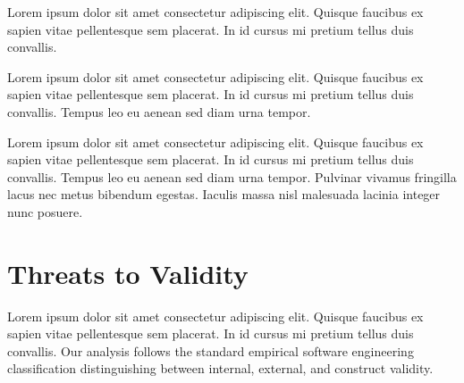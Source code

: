 \documentclass[sigconf,nonacm]{acmart} %
\begin{document}
Lorem ipsum dolor sit amet consectetur adipiscing elit. 
Quisque faucibus ex sapien vitae pellentesque sem placerat. 
In id cursus mi pretium tellus duis convallis. 

Lorem ipsum dolor sit amet consectetur adipiscing elit. 
Quisque faucibus ex sapien vitae pellentesque sem placerat. 
In id cursus mi pretium tellus duis convallis. 
Tempus leo eu aenean sed diam urna tempor. 

Lorem ipsum dolor sit amet consectetur adipiscing elit. 
Quisque faucibus ex sapien vitae pellentesque sem placerat. 
In id cursus mi pretium tellus duis convallis. 
Tempus leo eu aenean sed diam urna tempor. 
Pulvinar vivamus fringilla lacus nec metus bibendum egestas. 
Iaculis massa nisl malesuada lacinia integer nunc posuere. 

\section{Threats to Validity}
\label{sec:threats}

Lorem ipsum dolor sit amet consectetur adipiscing elit. 
Quisque faucibus ex sapien vitae pellentesque sem placerat. 
In id cursus mi pretium tellus duis convallis. 
Our analysis follows the standard empirical software engineering classification distinguishing between internal, external, and construct validity.
\end{document}

